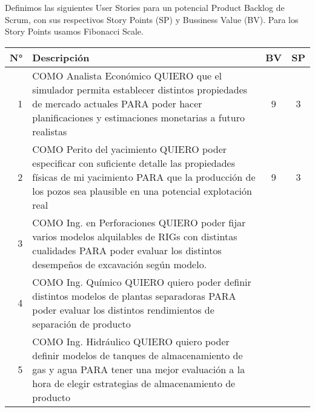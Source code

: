 Definimos las siguientes User Stories para un potencial Product Backlog de Scrum, con sus respectivos Story Points (SP) y Bussiness Value (BV). Para los Story Points usamos Fibonacci Scale.

\begin{center}
  \begin{tabular}{| r | p{13cm} | c | c | }
    \hline
    N° & Descripción & BV & SP\\  \hline

    1 & COMO Analista Económico QUIERO que el simulador permita establecer distintos propiedades de mercado actuales PARA poder hacer planificaciones y estimaciones monetarias a futuro realistas & 9 & 3\\ \hline

    2 & COMO Perito del yacimiento QUIERO poder especificar con suficiente detalle las propiedades físicas de mi yacimiento PARA que la producción de los pozos sea plausible en una potencial explotación real & 9 & 3\\ \hline

    3 & COMO Ing. en Perforaciones QUIERO poder fijar varios modelos alquilables de RIGs con distintas cualidades PARA poder evaluar los distintos desempeños de excavación según modelo. &  &  \\ \hline
      
    4 & COMO Ing. Químico QUIERO quiero poder definir distintos modelos de plantas separadoras PARA poder evaluar los distintos rendimientos de separación de producto &  & \\ \hline

    5 & COMO Ing. Hidráulico QUIERO quiero poder definir modelos de tanques de almacenamiento de gas y agua PARA tener una mejor evaluación a la hora de elegir estrategias de almacenamiento de producto &  & \\ \hline

    \end{tabular}
\end{center}

